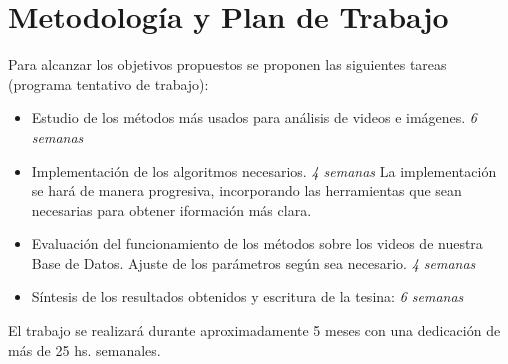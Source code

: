 \section{Metodología y Plan de Trabajo}
\iffalse
Se recomienda estructurar esta sección en función de los objetivos específicos.
* Planteo de la hipotesis a analizar en cada objetivo o seccion del proyecto.
* Actividades propuestas y metodologıa a usar en cada una de ellas.
* Resultados que se esperan obtener o metas a cumplir y como se evaluaran
los resultados.
Trate de evaluar los potenciales problemas y limitaciones de la metodolog ́ıa
y t ́ecnicas propuestas y en lo posible proponer alternativas.
\fi

Para alcanzar los objetivos propuestos se proponen las siguientes tareas (programa tentativo de trabajo):
\begin{itemize}
  \item Estudio de los métodos más usados para análisis de videos e imágenes. \textit{6 semanas}
  \item Implementación de los algoritmos necesarios. \textit{4 semanas}
    La implementación se hará de manera progresiva, incorporando las herramientas que
    sean necesarias para obtener iformación más clara.
  \item Evaluación del funcionamiento de los métodos sobre los videos de nuestra Base de Datos.
  Ajuste de los parámetros según sea necesario. \textit{4 semanas}
  \item Síntesis de los resultados obtenidos y escritura de la tesina: \textit{6 semanas}
\end{itemize}
El trabajo se realizará durante aproximadamente 5 meses con una dedicación de más de 25 hs. semanales.

